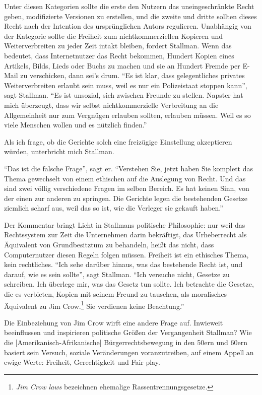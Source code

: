 Unter diesen Kategorien sollte die erste den Nutzern das uneingeschränkte Recht geben, modifizierte Versionen zu erstellen, und die zweite und dritte sollten dieses Recht nach der Intention des ursprünglichen Autors regulieren. Unabhängig von der Kategorie sollte die Freiheit zum nichtkommerziellen Kopieren und Weiterverbreiten zu jeder Zeit intakt bleiben, fordert Stallman. Wenn das bedeutet, dass Internetnutzer das Recht bekommen, Hundert Kopien eines Artikels, Bilds, Lieds oder Buchs zu machen und sie an Hundert Fremde per E-Mail zu verschicken, dann sei's drum. "`Es ist klar, dass gelegentliches privates Weiterverbreiten erlaubt sein muss, weil es nur ein Polizeistaat stoppen kann"', sagt Stallman. "`Es ist unsozial, sich zwischen Freunde zu stellen. Napster hat mich überzeugt, dass wir selbst nichtkommerzielle Verbreitung an die Allgemeinheit nur zum Vergnügen erlauben sollten, erlauben müssen. Weil es so viele Menschen wollen und es nützlich finden."'

Als ich frage, ob die Gerichte solch eine freizügige Einstellung akzeptieren würden, unterbricht mich Stallman.

"`Das ist die falsche Frage"', sagt er. "`Verstehen Sie, jetzt haben Sie komplett das Thema gewechselt von einem ethischen auf die Auslegung von Recht. Und das sind zwei völlig verschiedene Fragen im selben Bereich. Es hat keinen Sinn, von der einen zur anderen zu springen. Die Gerichte legen die bestehenden Gesetze ziemlich scharf aus, weil das so ist, wie die Verleger sie gekauft haben."'

Der Kommentar bringt Licht in Stallmans politische Philosophie: nur weil das Rechtssystem zur Zeit die Unternehmen darin bekräftigt, das Urheberrecht als Äquivalent von Grundbesitztum zu behandeln, heißt das nicht, dass Computernutzer diesen Regeln folgen müssen. Freiheit ist ein ethisches Thema, kein rechtliches. "`Ich sehe darüber hinaus, was das bestehende Recht ist, und darauf, wie es sein sollte"', sagt Stallman. "`Ich versuche nicht, Gesetze zu schreiben. Ich überlege mir, was das Gesetz tun sollte. Ich betrachte die Gesetze, die es verbieten, Kopien mit seinem Freund zu tauschen, als moralisches Äquivalent zu Jim Crow.\footnote{\textit{Jim Crow laws} bezeichnen ehemalige Rassentrennungsgesetze.} Sie verdienen keine Beachtung."'

Die Einbeziehung von Jim Crow wirft eine andere Frage auf. Inwieweit beeinflussen und inspirieren politische Größen der Vergangenheit Stallman? Wie die [Amerikanisch-Afrikanische] Bürgerrechtsbewegung in den 50ern und 60ern basiert sein Versuch, soziale Veränderungen voranzutreiben, auf einem Appell an ewige Werte: Freiheit, Gerechtigkeit und Fair play.

